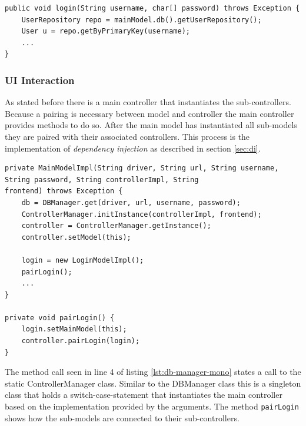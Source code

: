 \begin{lstlisting}[caption={[Code snippet showing how repositories are used in business code.]Code snippet showing how repositories are used in business code. The main model holds the single instance of the DBManager. Each sub-model accesses it by using a getter-method.}, captionpos=b, label={lst:db-access-bp}]
public void login(String username, char[] password) throws Exception {
	UserRepository repo = mainModel.db().getUserRepository();
	User u = repo.getByPrimaryKey(username);
	...
}
\end{lstlisting}

\subsubsection{UI Interaction}
As stated before there is a main controller that instantiates the sub-controllers. Because a pairing is necessary between model and controller the main controller provides methods to do so. After the main model has instantiated all sub-models they are paired with their associated controllers. This process is the implementation of \emph{dependency injection} as described in section \ref{sec:di}.

\begin{lstlisting}[caption={[Code snippet showing initialization code for the controller.]Code snippet showing initialization code for the controller. The main model retrieves the main controller by calling a getter which is similarily implemented as the DBManager class shown in listing \ref{lst:dbmanager}. After that he calls a method that pairs the sub-model with the sub-controller, a code snippet showing this process can be seen in listing \ref{lst:pairing}.}, captionpos=b, label={lst:db-manager-mono}]
private MainModelImpl(String driver, String url, String username, String password, String controllerImpl, String
frontend) throws Exception {
	db = DBManager.get(driver, url, username, password);
	ControllerManager.initInstance(controllerImpl, frontend);
	controller = ControllerManager.getInstance();
	controller.setModel(this);
	
	login = new LoginModelImpl();
	pairLogin();
	...
}

private void pairLogin() {
	login.setMainModel(this);
	controller.pairLogin(login);
}

\end{lstlisting}

The method call seen in line 4 of listing \ref{lst:db-manager-mono} states a call to the static ControllerManager class. Similar to the DBManager class this is a singleton class that holds a switch-case-statement that instantiates the main controller based on the implementation provided by the arguments. The method \texttt{pairLogin} shows how the sub-models are connected to their sub-controllers. 

